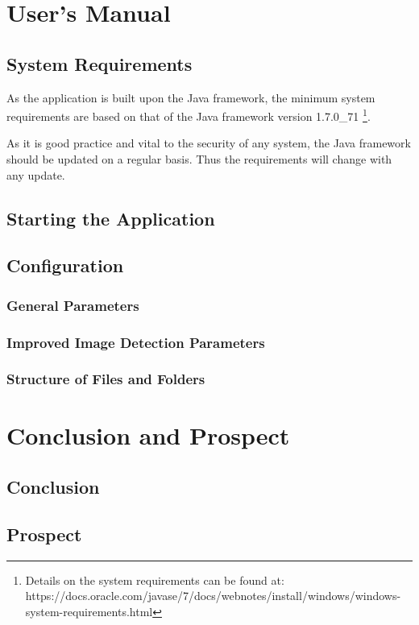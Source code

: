 \documentclass[a4paper, 11pt]{article}
\begin{document}
\section{User's Manual}

\subsection{System Requirements}
As the application is built upon the Java framework, the minimum system
requirements are based on that of the Java framework version 1.7.0\_71
\footnote{Details on the system requirements can be found at:
https://docs.oracle.com/javase/7/docs/webnotes/install/windows/windows-system-requirements.html}.

As it is good practice and vital to the security of any system, the Java
framework should be updated on a regular basis. Thus the requirements will
change with any update.

\subsection{Starting the Application}


\subsection{Configuration}
\subsubsection{General Parameters}
\subsubsection{Improved Image Detection Parameters}
\subsubsection{Structure of Files and Folders}

\newpage
\section{Conclusion and Prospect}
 
\subsection{Conclusion}

\subsection{Prospect}


\newpage
{}

\end{document}
